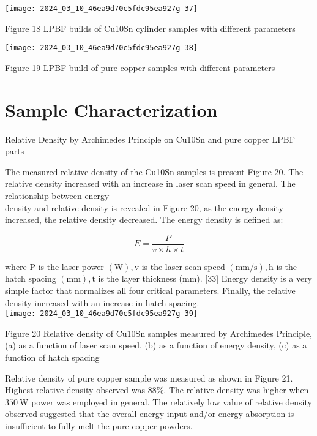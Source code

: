 \documentclass[10pt]{article}
\begin{document}
\begin{center}
\texttt{[image: 2024\_03\_10\_46ea9d70c5fdc95ea927g-37]}
\end{center}

Figure 18 LPBF builds of Cu10Sn cylinder samples with different parameters

\begin{center}
\texttt{[image: 2024\_03\_10\_46ea9d70c5fdc95ea927g-38]}
\end{center}

Figure 19 LPBF build of pure copper samples with different parameters

\section*{Sample Characterization}
Relative Density by Archimedes Principle on Cu10Sn and pure copper LPBF parts

The measured relative density of the Cu10Sn samples is present Figure 20. The relative density increased with an increase in laser scan speed in general. The relationship between energy\\
density and relative density is revealed in Figure 20, as the energy density increased, the relative density decreased. The energy density is defined as:


\begin{equation*}
E=\frac{P}{v \times h \times t} \tag{2}
\end{equation*}


where $\mathrm{P}$ is the laser power $(\mathrm{W}), \mathrm{v}$ is the laser scan speed $(\mathrm{mm} / \mathrm{s}), \mathrm{h}$ is the hatch spacing $(\mathrm{mm}), \mathrm{t}$ is the layer thickness (mm). [33] Energy density is a very simple factor that normalizes all four critical parameters. Finally, the relative density increased with an increase in hatch spacing.\\
\texttt{[image: 2024\_03\_10\_46ea9d70c5fdc95ea927g-39]}

Figure 20 Relative density of Cu10Sn samples measured by Archimedes Principle, (a) as a function of laser scan speed, (b) as a function of energy density, (c) as a function of hatch spacing

Relative density of pure copper sample was measured as shown in Figure 21. Highest relative density observed was $88 \%$. The relative density was higher when $350 \mathrm{~W}$ power was employed in general. The relatively low value of relative density observed suggested that the overall energy input and/or energy absorption is insufficient to fully melt the pure copper powders.
\end{document}

